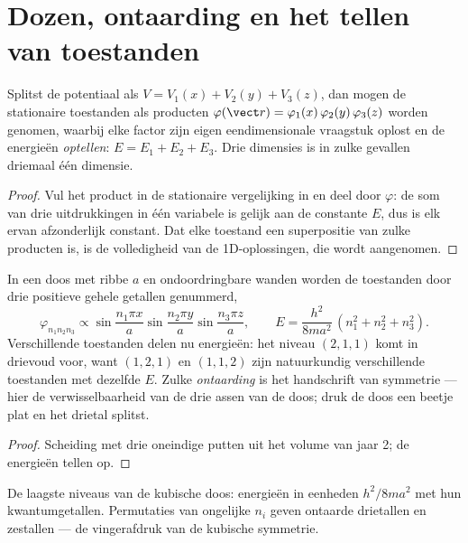 \section{Dozen, ontaarding en het tellen van toestanden}

\begin{theorem}\label{thm:b3:schrodinger-three-dimensions:separation}
Splitst de potentiaal als $V = V_1(x) + V_2(y) + V_3(z)$, dan mogen de
stationaire toestanden als producten $\varphi(\vect r) = \varphi_1(x)\,\varphi_2(y)\,\varphi_3(z)$ worden genomen, waarbij elke
factor zijn eigen eendimensionale vraagstuk oplost en de energieën
\emph{optellen}: $E = E_1 + E_2 + E_3$. Drie dimensies is in zulke
gevallen driemaal één dimensie.
\end{theorem}

\begin{proof}
Vul het product in de stationaire vergelijking in en deel door $\varphi$:
de som van drie uitdrukkingen in één variabele is gelijk aan de constante
$E$, dus is elk ervan afzonderlijk constant. Dat elke toestand een
superpositie van zulke producten is, is de volledigheid van de
1D-oplossingen, die wordt aangenomen.
\end{proof}

\begin{proposition}\label{prop:b3:schrodinger-three-dimensions:box}
In een doos met ribbe $a$ en ondoordringbare wanden worden de toestanden
door drie positieve gehele getallen genummerd,
\[
\varphi_{n_1n_2n_3} \propto
\sin\frac{n_1\pi x}{a}\sin\frac{n_2\pi y}{a}\sin\frac{n_3\pi z}{a} ,
\qquad
E = \frac{h^2}{8ma^2}\,(n_1^2 + n_2^2 + n_3^2) .
\]
Verschillende toestanden delen nu energieën: het niveau $(2,1,1)$ komt in
drievoud voor, want $(1,2,1)$ en $(1,1,2)$ zijn natuurkundig
verschillende toestanden met dezelfde $E$. Zulke \emph{ontaarding} is het
handschrift van symmetrie --- hier de verwisselbaarheid van de drie assen
van de doos; druk de doos een beetje plat en het drietal splitst.
\end{proposition}

\begin{proof}
Scheiding met drie oneindige putten uit het volume van jaar 2; de
energieën tellen op.
\end{proof}

\begin{omfigure}

{\small De laagste niveaus van de kubische doos: energieën in eenheden
$h^2/8ma^2$ met hun kwantumgetallen. Permutaties van ongelijke $n_i$
geven ontaarde drietallen en zestallen --- de vingerafdruk van de
kubische symmetrie.}
\end{omfigure}

